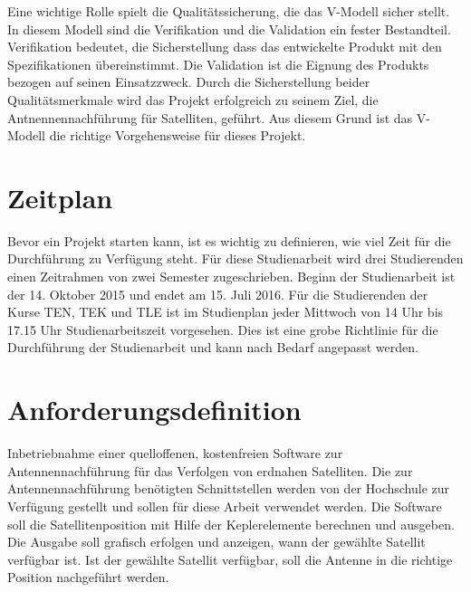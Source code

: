 Eine wichtige Rolle spielt die Qualitätssicherung, die das V-Modell sicher stellt. In diesem Modell sind die Verifikation und die Validation ein 
fester Bestandteil. Verifikation bedeutet, die Sicherstellung dass das entwickelte Produkt mit den Spezifikationen übereinstimmt.
Die Validation ist die Eignung des Produkts bezogen auf seinen Einsatzzweck. Durch die Sicherstellung beider Qualitätsmerkmale wird das Projekt 
erfolgreich zu seinem Ziel, die Antnennennachführung für Satelliten, geführt. Aus diesem Grund ist das V-Modell die richtige Vorgehensweise für 
dieses Projekt.

\section{Zeitplan}
Bevor ein Projekt starten kann, ist es wichtig  zu definieren, wie viel Zeit für die Durchführung zu Verfügung steht. Für diese Studienarbeit 
wird drei Studierenden einen Zeitrahmen von zwei Semester zugeschrieben. Beginn der Studienarbeit ist der 14. Oktober 2015 und endet am 15. Juli 
2016. Für die Studierenden der Kurse TEN, TEK und TLE ist im Studienplan jeder Mittwoch von 14 Uhr bis 17.15 Uhr Studienarbeitszeit vorgesehen. Dies 
ist eine grobe Richtlinie für die Durchführung der Studienarbeit und kann nach Bedarf angepasst werden.

\section{Anforderungsdefinition}
Inbetriebnahme einer quelloffenen, kostenfreien Software zur Antennennachführung für das Verfolgen von erdnahen Satelliten. Die zur 
Antennennachführung
benötigten Schnittstellen werden von der Hochschule zur Verfügung gestellt und sollen für diese Arbeit verwendet werden. Die Software soll die 
Satellitenposition mit Hilfe der Keplerelemente berechnen und ausgeben. Die Ausgabe soll grafisch erfolgen und anzeigen, wann
der gewählte Satellit verfügbar ist. Ist der gewählte Satellit verfügbar, soll die Antenne in die richtige Position nachgeführt werden. 

\newpage

